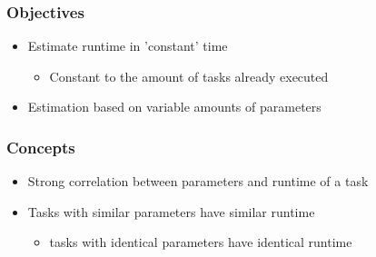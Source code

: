 

\begin{frame}
	\frametitle{Objectives}
		\begin{itemize}
			\item<2-> {Estimate runtime in 'constant' time}
				\begin{itemize}
					\item<3-> {Constant to the amount of tasks already executed}	
				\end{itemize}
				\item<4-> {Estimation based on variable amounts of parameters}
			\end{itemize}
\end{frame}		
		
\begin{frame} 
	\frametitle{Concepts}
		\begin{itemize}
			\item<2-> {Strong correlation between parameters and runtime of a task}
			\item<3-> {Tasks with similar parameters have similar runtime}
				\begin{itemize}
					\item<4-> {tasks with identical parameters have identical runtime}	
				\end{itemize}	
		\end{itemize}
\end{frame}


